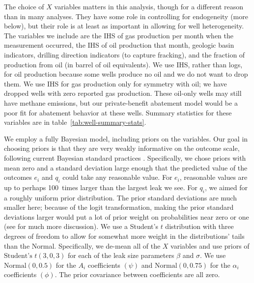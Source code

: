 \documentclass[12pt,oneside,letterpaper]{article}
\theoremstyle{definition}
\begin{document}
\begin{refsection}
The choice of \(X\) variables matters in this analysis, though for a different reason than in many analyses.
They have some role in controlling for endogeneity (more below), but their role is at least as important in allowing for well heterogeneity.
The variables we include are the \gls{IHS} of gas production per month when the measurement occurred, the \gls{IHS} of oil production that month, geologic basin indicators, drilling direction indicators (to capture fracking), and the fraction of production from oil (in barrel of oil equivalents).
We use \gls{IHS}, rather than logs, for oil production because some wells produce no oil and we do not want to drop them.
We use \gls{IHS} for gas production only for symmetry with oil;
we have dropped wells with zero reported gas production.
These oil-only wells may still have methane emissions, but our private-benefit abatement model would be a poor fit for abatement behavior at these wells.
Summary statistics for these variables are in table~\ref{tab:well-summary-stats}.


We employ a fully Bayesian model, including priors on the variables.
Our goal in choosing priors is that they are very weakly informative on the outcome scale,
following current Bayesian standard practices \parencite{Gelman/etal:2020}.
Specifically, we chose priors with mean zero and a standard deviation large enough that the predicted value of the outcomes \(e_i\) and \(q_i\) could take any reasonable value.
For \(e_i\), reasonable values are up to perhaps 100~times larger than the largest leak we see.
For \(q_i\), we aimed for a roughly uniform prior distribution.
The prior standard deviations are much smaller here;
because of the logit transformation, making the prior standard deviations larger would put a lot of prior weight on probabilities near zero or one
(see \cite{Gelman/etal:2020} for much more discussion).
We use a Student's \(t\) distribution with three degrees of freedom to allow for somewhat more weight in the distributions' tails than the Normal.
Specifically, we de-mean all of the \(X\) variables and use priors of
\(\text{Student's } t(3, 0, 3)\) for each of the leak size parameters \(\beta\) and \(\sigma\).
We use \(\text{Normal}(0, 0.5)\) for the \(A_i\) coefficients \((\psi)\) and
\(\text{Normal}(0, 0.75)\) for the \(\alpha_i\) coefficients \((\phi)\).
The prior covariance between coefficients are all zero.


\end{refsection}
\end{document}
